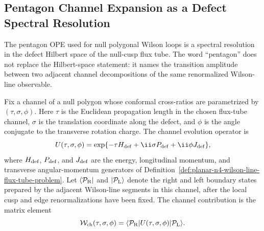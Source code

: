 \subsection{Pentagon Channel Expansion as a Defect Spectral Resolution}

The pentagon OPE used for null polygonal Wilson loops is a spectral
resolution in the defect Hilbert space of the null-cusp flux tube.  The word
``pentagon'' does not replace the Hilbert-space statement: it names the
transition amplitude between two adjacent channel decompositions of the same
renormalized Wilson-line observable.

Fix a channel of a null polygon whose conformal cross-ratios are parametrized
by \((\tau,\sigma,\phi)\).  Here \(\tau\) is the Euclidean propagation length
in the chosen flux-tube channel, \(\sigma\) is the translation coordinate
along the defect, and \(\phi\) is the angle conjugate to the transverse
rotation charge.  The channel evolution operator is
\begin{equation}
  U(\tau,\sigma,\phi)
  =
  \exp\{-\tau H_{\rm def}
        +\ii\sigma P_{\rm def}
        +\ii\phi J_{\rm def}\},
  \label{eq:n4-flux-tube-channel-evolution}
\end{equation}
where \(H_{\rm def}\), \(P_{\rm def}\), and \(J_{\rm def}\) are the energy,
longitudinal momentum, and transverse angular-momentum generators of
Definition~\ref{def:planar-n4-wilson-line-flux-tube-problem}.  Let
\(\langle\mathcal P_{\rm R}|\) and \(|\mathcal P_{\rm L}\rangle\) denote the
right and left boundary states prepared by the adjacent Wilson-line segments
in this channel, after the local cusp and edge renormalizations have been
fixed.  The channel contribution is the matrix element
\begin{equation}
  \mathcal W_{\rm ch}(\tau,\sigma,\phi)
  =
  \langle\mathcal P_{\rm R}|
  U(\tau,\sigma,\phi)
  |\mathcal P_{\rm L}\rangle .
  \label{eq:n4-pentagon-channel-matrix-element}
\end{equation}

